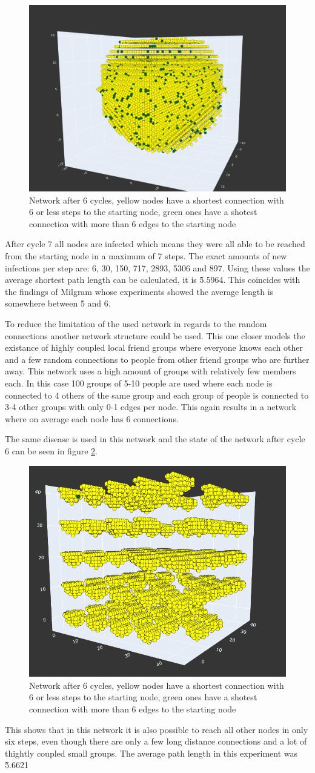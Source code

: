 \begin{figure}
    \centering
    \includegraphics[width=0.5\linewidth]{images/small_world_network.png}
    \caption{Network after 6 cycles, yellow nodes have a shortest connection with 6 or less steps to the starting node,
    green ones have a shotest connection with more than 6 edges to the starting node}
    \label{fig:small_world_network}
\end{figure}

After cycle 7 all nodes are infected which means they were all able to be reached from the 
starting node in a maximum of 7 steps. The exact amounts of new infections per step are:
6, 30, 150, 717, 2893, 5306 and 897. Using these values the average shortest path length
can be calculated, it is \~5.5964. This coincides with the findings of Milgram \cite{smallWorld}
whose experiments showed the average length is somewhere between 5 and 6.

To reduce the limitation of the used network in regards to the random connections another
network structure could be used. This one closer models the existance of highly coupled
local friend groups where everyone knows each other and a few random connections to people
from other friend groups who are further away. This network uses a high amount of
groups with relatively few members each. In this case 100 groups of 5-10 people are used
where each node is connected to 4 others of the same group and each group of people is
connected to 3-4 other groups with only 0-1 edges per node. This again results in a network
where on average each node has 6 connections.

The same disease is used in this network and the state of the network after cycle 6
can be seen in figure \ref{fig:small_world_groups}.

\begin{figure}
    \centering
    \includegraphics[width=0.5\linewidth]{images/small_world_groups.png}
    \caption{Network after 6 cycles, yellow nodes have a shortest connection with 6 or less steps to the starting node,
    green ones have a shotest connection with more than 6 edges to the starting node}
    \label{fig:small_world_groups}
\end{figure}

This shows that in this network it is also possible to reach all other nodes in only six steps,
even though there are only a few long distance connections and a lot of thightly coupled
small groups. The average path length in this experiment was \~5.6621


